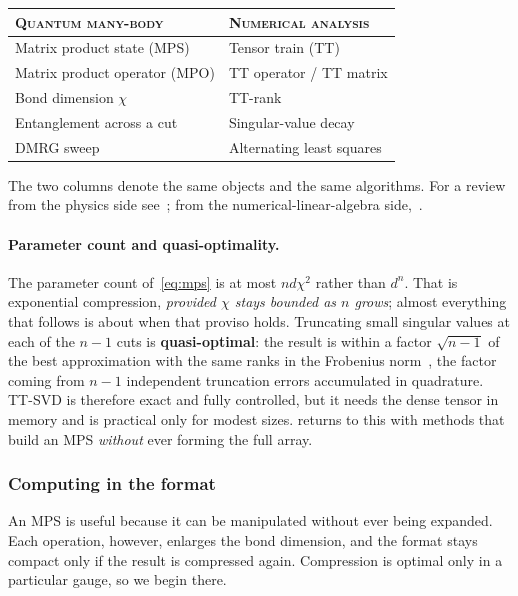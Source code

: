 \begin{center}
  \begin{tabular}{ll}
    \toprule
    \textsc{Quantum many-body} & \textsc{Numerical analysis} \\
    \midrule
    Matrix product state (MPS)   & Tensor train (TT) \\
    Matrix product operator (MPO) & TT operator / TT matrix \\
    Bond dimension $\chi$        & TT-rank \\
    Entanglement across a cut    & Singular-value decay \\
    DMRG sweep                   & Alternating least squares \\
    \bottomrule
  \end{tabular}
\end{center}
\noindent
The two columns denote the same objects and the same algorithms. For a review
from the physics side see~\cite{Orus2014}; from the numerical-linear-algebra
side,~\cite{Oseledets2011}.

\paragraph{Parameter count and quasi-optimality.}
The parameter count of~\eqref{eq:mps} is at most $n d\chi^2$ rather than $d^n$.
That is exponential compression, \emph{provided $\chi$ stays bounded as $n$
grows}; almost everything that follows is about when that proviso holds.
Truncating small singular values at each of the $n-1$ cuts is
\textbf{quasi-optimal}: the result is within a factor $\sqrt{n-1}$ of the best
approximation with the same ranks in the Frobenius norm~\cite{Oseledets2011},
the factor coming from $n-1$ independent truncation errors accumulated in
quadrature. TT-SVD is therefore exact and fully controlled, but it needs the
dense tensor in memory and is practical only for modest sizes.
 returns to this with methods that build an MPS
\emph{without} ever forming the full array.

\subsubsection{Computing in the format}
\label{subsec:tt-computing}

An MPS is useful because it can be manipulated without ever being expanded.
Each operation, however, enlarges the bond dimension, and the format stays
compact only if the result is compressed again. Compression is optimal only in a
particular gauge, so we begin there.

